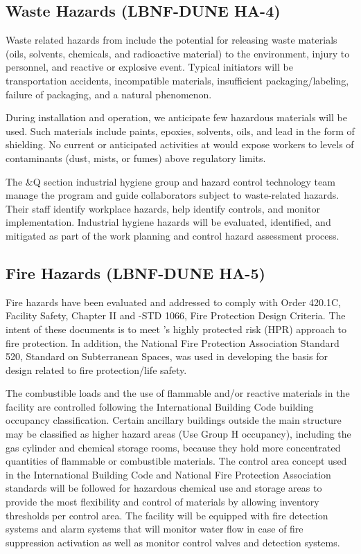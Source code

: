 \subsection{Waste Hazards (LBNF-DUNE HA-4)}

Waste related hazards from  include the potential for
releasing waste materials (oils, solvents, chemicals, and radioactive
material) to the environment, injury to personnel, and reactive or
explosive event. Typical initiators will be transportation accidents,
incompatible materials, insufficient packaging/labeling, failure of
packaging, and a natural phenomenon.

During installation and  operation, we anticipate few
hazardous materials will be used. Such materials include paints,
epoxies, solvents, oils, and lead in the form of shielding. No current
or anticipated activities at  would expose workers to
levels of contaminants (dust, mists, or fumes) above regulatory
limits.

The \&Q section industrial hygiene group and hazard control
technology team manage the program and guide collaborators subject to
waste-related hazards.  Their staff identify workplace hazards, help
identify controls, and monitor implementation. Industrial hygiene
hazards will be evaluated, identified, and mitigated as part of the
work planning and control hazard assessment process.

\subsection{Fire Hazards (LBNF-DUNE HA-5)}

Fire hazards have been evaluated and addressed to comply with
 Order 420.1C, Facility Safety, Chapter II and
-STD 1066, Fire Protection Design Criteria.  The intent of
these documents is to meet 's highly protected risk (HPR)
approach to fire protection.  In addition, the National Fire
Protection Association Standard 520, Standard on Subterranean Spaces,
was used in developing the basis for design related to fire
protection/life safety.

The combustible loads and the use of flammable and/or reactive
materials in the  facility are controlled
following the International Building Code building occupancy
classification. Certain ancillary buildings outside the main structure
may be classified as higher hazard areas (Use Group H occupancy),
including the gas cylinder and chemical storage rooms, because they
hold more concentrated quantities of flammable or combustible
materials.  The control area concept used in the International
Building Code and National Fire Protection Association standards will
be followed for hazardous chemical use and storage areas to provide
the most flexibility and control of materials by allowing inventory
thresholds per control area.  The  facility
will be equipped with fire detection systems and alarm systems that
will monitor water flow in case of fire suppression activation as well
as monitor control valves and detection systems.

